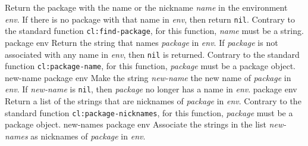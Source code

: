 \vskip -0.2cm
Return the package with the name or the nickname \textit{name} in the
environment \textit{env}.  If there is no package with that name
in \textit{env}, then return \texttt{nil}.  Contrary to
the standard \commonlisp{} function \texttt{cl:find-package}, for this
function, \textit{name} must be a string.
\vskip -0.05cm
 {package env}
\vskip -0.2cm
Return the string that names \textit{package} in \textit{env}.
If \textit{package} is not associated with any name in \textit{env},
then \texttt{nil} is returned.  Contrary to the standard \commonlisp{}
function \texttt{cl:package-name}, for this function, \textit{package}
must be a package object.
\vskip -0.05cm
 {new-name package env}
\vskip -0.2cm
Make the string \textit{new-name} the new name of \textit{package}
in \textit{env}.  If \textit{new-name} is \texttt{nil},
then \textit{package} no longer has a name in \textit{env}.
\vskip -0.05cm
 {package env}
\vskip -0.2cm
Return a list of the strings that are nicknames of \textit{package}
in \textit{env}.  Contrary to the standard \commonlisp{}
function \texttt{cl:package-nicknames}, for this function, \textit{package}
must be a package object.
\vskip -0.05cm
 {new-names package env}
\vskip -0.2cm
Associate the strings in the list \textit{new-names} as nicknames
of \textit{package} in \textit{env}.
